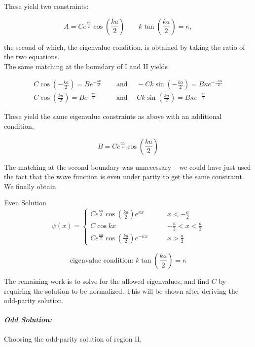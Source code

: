 These yield two constraints: 

\[
  A = Ce^{\frac{\kappa a}{2}} \cos \left( \frac{ka}{2} \right) \qquad k\tan
  \left( \frac{ka}{2} \right) = \kappa,   
\] \vspace{3px}

the second of which, the eigenvalue condition, is obtained by taking the ratio
of the two equations. \\
The same matching at the boundary of I and II yields

\begin{align} \label{}
  C\cos \left( -\frac{ka}{2} \right)  = Be^{-\frac{ka}{2}} \quad &\text{ and
  }  \quad -Ck\sin \left( -\frac{ka}{2} \right) = B\kappa e^{-\frac{-\kappa
  a}{2}} \\ C\cos \left( \frac{ka}{2} \right) = Be^{-\frac{ka}{2}} \quad
  &\text{ and } \quad Ck\sin\left( \frac{ka}{2} \right) = B\kappa
e^{-\frac{\kappa a}{2}}  
\end{align}\vspace{3px}

These yield the same eigenvalue constraints as above with an additional
condition, 

\[
  B = Ce^{\frac{\kappa a}{2}} \cos \left( \frac{ka}{2} \right)  
\] \vspace{3px}

The matching at the second boundary was unnecessary -- we could have just used
the fact that the wave function is even under parity to get the same
constraint. We finally obtain

\begin{subbox}{Even Solution}
  \[
  \psi(x) = \begin{cases}
    Ce^{\frac{\kappa a}{2}} \cos \left( \frac{ka}{2} \right) e^{\kappa x}
    \qquad &x < -\frac{a}{2} \\ C \cos kx \qquad &-\frac{a}{2}
    < x < \frac{a}{2} \\ Ce^{\frac{\kappa a }{2}} \cos \left( \frac{ka}{2}
  \right) e^{-\kappa x} \qquad &x > \frac{a}{2}  
  \end{cases} 
\] 

\[ \text{eigenvalue condition: } k \tan \left( \frac{ka}{2} \right) = \kappa \]  
\end{subbox}


The remaining work is to solve for the allowed eigenvalues, and find $C$ by
requiring the solution to be normalized. This will be shown after deriving the
odd-parity solution.

\paragraph{\textit{Odd Solution:}} Choosing the odd-parity solution of region
II, 

